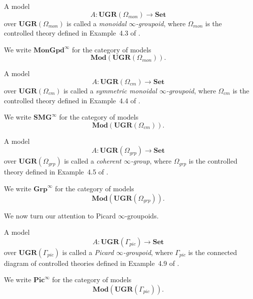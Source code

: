 \documentclass{tac}
\begin{document}
\begin{definition}\label{monoid_inf_grpds}
A model
\[
A:\mathbf{UGR}(\Omega_{mon})\to\mathbf{Set}
\]
over $\mathbf{UGR}(\Omega_{mon})$ is called a \emph{monoidal $\infty$-groupoid}, where $\Omega_{mon}$ is the controlled theory defined in Example~4.3 of \cite{Taylor2026Controlled}.
\end{definition}

\begin{notation}
We write $\mathbf{MonGpd}^\infty$ for the category of models
\[
\mathbf{Mod}(\mathbf{UGR}(\Omega_{mon})).
\]
\end{notation}

\begin{definition}\label{sym_monoid_inf_grpds}
A model
\[
A:\mathbf{UGR}(\Omega_{cm})\to\mathbf{Set}
\]
over $\mathbf{UGR}(\Omega_{cm})$ is called a \emph{symmetric monoidal $\infty$-groupoid}, where $\Omega_{cm}$ is the controlled theory defined in Example~4.4 of \cite{Taylor2026Controlled}.
\end{definition}

\begin{notation}
We write $\mathbf{SMG}^\infty$ for the category of models
\[
\mathbf{Mod}(\mathbf{UGR}(\Omega_{cm})).
\]
\end{notation}

\begin{definition}\label{inf_groups}
A model
\[
A:\mathbf{UGR}(\Omega_{grp})\to\mathbf{Set}
\]
over $\mathbf{UGR}(\Omega_{grp})$ is called a \emph{coherent $\infty$-group}, where $\Omega_{grp}$ is the controlled theory defined in Example~4.5 of \cite{Taylor2026Controlled}.
\end{definition}

\begin{notation}
We write $\mathbf{Grp}^\infty$ for the category of models
\[
\mathbf{Mod}(\mathbf{UGR}(\Omega_{grp})).
\]
\end{notation}

We now turn our attention to Picard $\infty$-groupoids.

\begin{definition}\label{def_of_pic_inf_grpd}
A model
\[
A:\mathbf{UGR}(\Gamma_{pic})\to\mathbf{Set}
\]
over $\mathbf{UGR}(\Gamma_{pic})$ is called a \emph{Picard $\infty$-groupoid}, where $\Gamma_{pic}$ is the connected diagram of controlled theories defined in Example~4.9 of \cite{Taylor2026Controlled}.
\end{definition}

\begin{notation}
We write $\mathbf{Pic}^\infty$ for the category of models
\[
\mathbf{Mod}(\mathbf{UGR}(\Gamma_{pic})).
\]
\end{notation}
\end{document}
